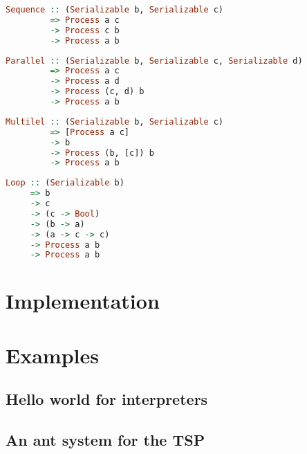 \begin{lstlisting}[language=Haskell]
Sequence :: (Serializable b, Serializable c)
         => Process a c
         -> Process c b
         -> Process a b
\end{lstlisting}

\begin{lstlisting}[language=Haskell]
Parallel :: (Serializable b, Serializable c, Serializable d)
         => Process a c
         -> Process a d
         -> Process (c, d) b
         -> Process a b
\end{lstlisting}

\begin{lstlisting}[language=Haskell]
Multilel :: (Serializable b, Serializable c)
         => [Process a c]
         -> b
         -> Process (b, [c]) b
         -> Process a b
\end{lstlisting}

\begin{lstlisting}[language=Haskell]
Loop :: (Serializable b)
     => b
     -> c
     -> (c -> Bool)
     -> (b -> a)
     -> (a -> c -> c)
     -> Process a b
     -> Process a b
\end{lstlisting}

\section{Implementation}

\section{Examples}

\subsection{Hello world for interpreters}

\subsection{An ant system for the TSP}